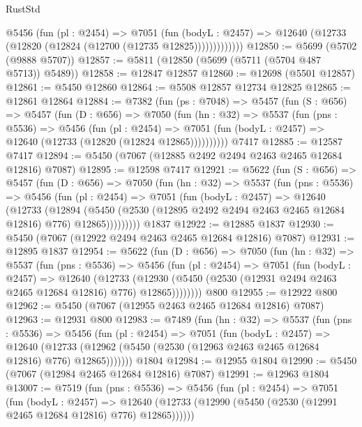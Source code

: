\begin{lexlean}{RustStd}
\begin{coremodule}
              @5456
                (fun (pl : @2454) =>
                @7051
                  (fun (bodyL : @2457) =>
                  @12640 (@12733 (@12820 (@12824 (@12700 (@12735 @12825)))))))))))))
@12850 := @5699 (@5702 (@9888 @5707))
@12857 := @5811 (@12850 (@5699 (@5711 (@5704 @487 @5713)) @5489))
@12858 := @12847 @12857
@12860 := @12698 (@5501 @12857)
@12861 := @5450 @12860
@12864 := @5508 @12857 @12734 @12825
@12865 := @12861 @12864
@12884 := @7382
    (fun (ps : @7048) =>
    @5457
      (fun (S : @656) =>
      @5457
        (fun (D : @656) =>
        @7050
          (fun (hn : @32) =>
          @5537
            (fun (pns : @5536) =>
            @5456
              (fun (pl : @2454) =>
              @7051 (fun (bodyL : @2457) => @12640 (@12733 (@12820 (@12824 @12865))))))))))
    @7417
@12885 := @12587 @7417
@12894 := @5450 (@7067 (@12885 @2492 @2494 @2463 @2465 @12684 @12816) @7087)
@12895 := @12598 @7417
@12921 := @5622
    (fun (S : @656) =>
    @5457
      (fun (D : @656) =>
      @7050
        (fun (hn : @32) =>
        @5537
          (fun (pns : @5536) =>
          @5456
            (fun (pl : @2454) =>
            @7051
              (fun (bodyL : @2457) =>
              @12640
                (@12733
                  (@12894
                    (@5450
                      (@2530 (@12895 @2492 @2494 @2463 @2465 @12684 @12816) @776)
                      @12865)))))))))
    @1837
@12922 := @12885 @1837
@12930 := @5450 (@7067 (@12922 @2494 @2463 @2465 @12684 @12816) @7087)
@12931 := @12895 @1837
@12954 := @5622
    (fun (D : @656) =>
    @7050
      (fun (hn : @32) =>
      @5537
        (fun (pns : @5536) =>
        @5456
          (fun (pl : @2454) =>
          @7051
            (fun (bodyL : @2457) =>
            @12640
              (@12733
                (@12930 (@5450 (@2530 (@12931 @2494 @2463 @2465 @12684 @12816) @776) @12865))))))))
    @800
@12955 := @12922 @800
@12962 := @5450 (@7067 (@12955 @2463 @2465 @12684 @12816) @7087)
@12963 := @12931 @800
@12983 := @7489
    (fun (hn : @32) =>
    @5537
      (fun (pns : @5536) =>
      @5456
        (fun (pl : @2454) =>
        @7051
          (fun (bodyL : @2457) =>
          @12640
            (@12733 (@12962 (@5450 (@2530 (@12963 @2463 @2465 @12684 @12816) @776) @12865)))))))
    @1804
@12984 := @12955 @1804
@12990 := @5450 (@7067 (@12984 @2465 @12684 @12816) @7087)
@12991 := @12963 @1804
@13007 := @7519
    (fun (pns : @5536) =>
    @5456
      (fun (pl : @2454) =>
      @7051
        (fun (bodyL : @2457) =>
        @12640 (@12733 (@12990 (@5450 (@2530 (@12991 @2465 @12684 @12816) @776) @12865))))))

\end{coremodule}
\end{lexlean}
